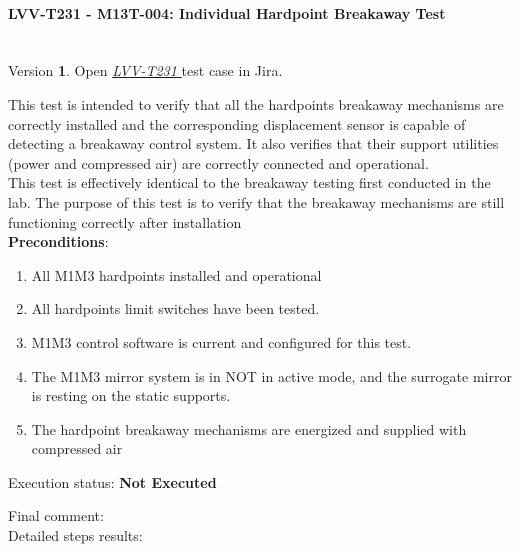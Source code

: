 \documentclass[SE,lsstdraft,STR,toc]{lsstdoc}
\providecommand{\tightlist}{
  \setlength{\itemsep}{0pt}\setlength{\parskip}{0pt}}
\begin{document}
\paragraph{ LVV-T231 - M13T-004: Individual Hardpoint Breakaway Test }\mbox{}\\

Version \textbf{1}.
Open  \href{https://jira.lsstcorp.org/secure/Tests.jspa#/testCase/LVV-T231}{\textit{ LVV-T231 } }
test case in Jira.

This test is intended to verify that all the hardpoints breakaway
mechanisms are correctly installed and the corresponding displacement
sensor is capable of detecting a breakaway control system. It also
verifies that their support utilities (power and compressed air) are
correctly connected and operational.\\
This test is effectively identical to the breakaway testing first
conducted in the lab. The purpose of this test is to verify that the
breakaway mechanisms are still functioning correctly after
installation\\[2\baselineskip]

\textbf{ Preconditions}:\\
\begin{enumerate}
\tightlist
\item
  All M1M3 hardpoints installed and operational
\item
  All hardpoints limit switches have been tested.
\item
  M1M3 control software is current and configured for this test.
\item
  The M1M3 mirror system is in NOT in active mode, and the surrogate
  mirror is resting on the static supports.
\item
  The hardpoint breakaway mechanisms are energized and supplied with
  compressed air
\end{enumerate}

Execution status: {\bf Not Executed }

Final comment:\\


Detailed steps results:
\end{document}
